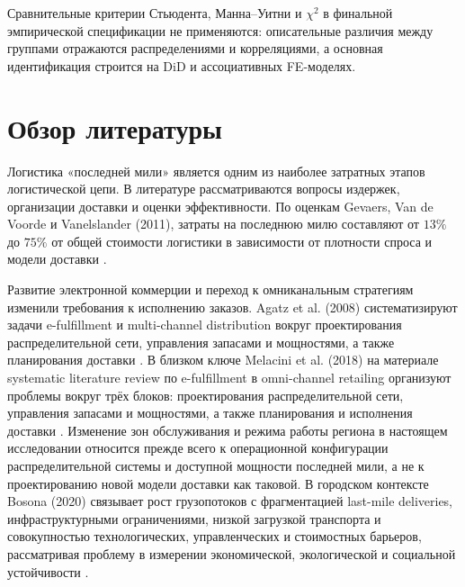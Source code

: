 \documentclass[14pt,a4paper]{extarticle}
\begin{document}
Сравнительные критерии Стьюдента, Манна--Уитни и \(\chi^2\) в финальной эмпирической спецификации не применяются: описательные различия между группами отражаются распределениями и корреляциями, а основная идентификация строится на DiD и ассоциативных FE-моделях.

\section{Обзор литературы}

Логистика «последней мили» является одним из наиболее затратных этапов логистической цепи. В литературе рассматриваются вопросы издержек, организации доставки и оценки эффективности. По оценкам Gevaers, Van de Voorde и Vanelslander (2011), затраты на последнюю милю составляют от $13\%$ до $75\%$ от общей стоимости логистики в зависимости от плотности спроса и модели доставки \cite{gevaers2011}.

Развитие электронной коммерции и переход к омниканальным стратегиям изменили требования к исполнению заказов. Agatz et al. (2008) систематизируют задачи e-fulfillment и multi-channel distribution вокруг проектирования распределительной сети, управления запасами и мощностями, а также планирования доставки \cite{agatz2008}. В близком ключе Melacini et al. (2018) на материале systematic literature review по e-fulfillment в omni-channel retailing организуют проблемы вокруг трёх блоков: проектирования распределительной сети, управления запасами и мощностями, а также планирования и исполнения доставки \cite{melacini2018}. Изменение зон обслуживания и режима работы региона в настоящем исследовании относится прежде всего к операционной конфигурации распределительной системы и доступной мощности последней мили, а не к проектированию новой модели доставки как таковой. В городском контексте Bosona (2020) связывает рост грузопотоков с фрагментацией last-mile deliveries, инфраструктурными ограничениями, низкой загрузкой транспорта и совокупностью технологических, управленческих и стоимостных барьеров, рассматривая проблему в измерении экономической, экологической и социальной устойчивости \cite{bosona2020}.
\end{document}
